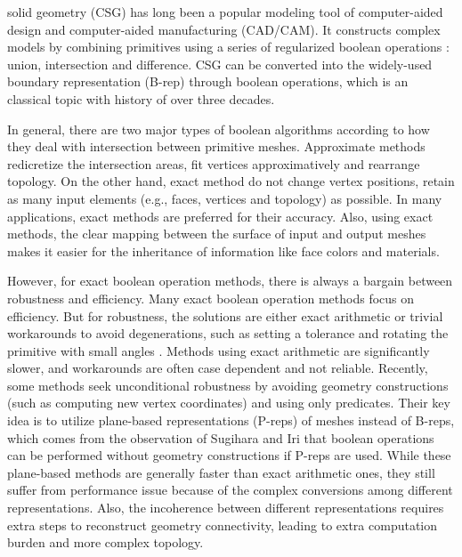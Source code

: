 \documentclass[10pt,journal,compsoc]{IEEEtran}
\begin{document}
\maketitle


\IEEEdisplaynontitleabstractindextext
\IEEEpeerreviewmaketitle

 solid geometry (CSG) has long been a popular modeling tool of computer-aided design and computer-aided manufacturing (CAD/CAM). It constructs complex models by combining primitives using a series of regularized boolean operations \cite{requicha1977mathematical,tilove1980closure}: union, intersection and difference. CSG can be converted into the widely-used boundary representation (B-rep) through boolean operations, which is an classical topic with history of over three decades.

In general, there are two major types of boolean algorithms according to how they deal with intersection between primitive meshes. Approximate methods \cite{wang2011approximate,pavic2010hybrid,biermann2001approximate} redicretize the intersection areas, fit vertices approximatively and rearrange topology. On the other hand, exact method do not change vertex positions, retain as many input elements  (e.g., faces, vertices and topology) as possible. In many applications, exact methods are preferred for their accuracy. Also, using exact methods, the clear mapping between the surface of input and output meshes makes it easier for the inheritance of information like face colors and materials.


However, for exact boolean operation methods, there is always a bargain between robustness and efficiency. Many exact boolean operation methods focus on efficiency. But for robustness, the solutions are either exact arithmetic \cite{barki2015exact,zhou2016mesh} or trivial workarounds to avoid degenerations, such as setting a tolerance \cite{feito2013fast,segal1990using} and rotating the primitive with small angles \cite{douze2015quickcsg}. Methods using exact arithmetic are significantly slower, and workarounds are often case dependent and not reliable. Recently, some methods \cite{bernstein2009fast,campen2010exact} seek unconditional robustness by avoiding geometry constructions (such as computing new vertex coordinates) and using only predicates. Their key idea is to utilize plane-based representations (P-reps) of meshes instead of B-reps, which comes from the observation of Sugihara and Iri \cite{sugihara1990solid} that boolean operations can be performed without geometry constructions if P-reps are used. While these plane-based methods are generally faster than exact arithmetic ones, they still suffer from performance issue because of the complex conversions among different representations. Also, the incoherence between different representations requires extra steps to reconstruct geometry connectivity, leading to extra computation burden and more complex topology.
\end{document}

